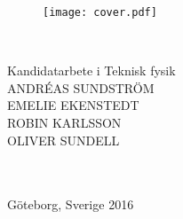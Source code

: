 

\begin{titlepage}
			
\addtolength{\voffset}{2cm}

\begin{figure}[h!]
\centering
\vspace{2cm}	%

\texttt{[image: cover.pdf]}
\end{figure}

\mbox{}
\vfill
\renewcommand{\familydefault}{\sfdefault} \normalfont %

\begin{flushleft}
\textbf{{\Huge \titel }} 	\\[0.5cm]
{\Large \undertitel }       \setlength{\parskip}{0.5cm}

Kandidatarbete i Teknisk fysik \\[1cm]

{\Large 
ANDRÉAS SUNDSTRÖM \\%
EMELIE EKENSTEDT \\%
ROBIN KARLSSON \\%
OLIVER SUNDELL\\[2cm]
} 

\institution \\
\textsc{\skola} \\
Göteborg, Sverige 2016
\end{flushleft}

\renewcommand{\familydefault}{\rmdefault} \normalfont %
\end{titlepage}


\newpage
\restoregeometry
\thispagestyle{empty}
\mbox{}


